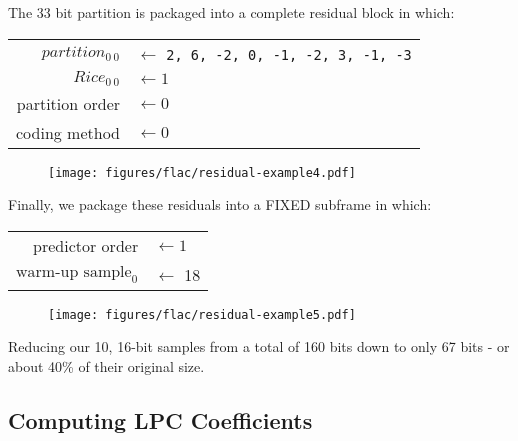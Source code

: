 The 33 bit partition is packaged into a complete residual block
in which:
\newline
\begin{tabular}{rl}
$partition_{0~0}$ & $\leftarrow$ \texttt{2, 6, -2, 0, -1, -2, 3, -1, -3} \\
$Rice_{0~0}$ & $\leftarrow 1$ \\
partition order & $\leftarrow 0$ \\
coding method & $\leftarrow 0$ \\
\end{tabular}
\begin{figure}[h]
\texttt{[image: figures/flac/residual-example4.pdf]}
\end{figure}
\par
Finally, we package these residuals into a FIXED subframe in which:
\newline
\begin{tabular}{rl}
predictor order & $\leftarrow 1$ \\
$\text{warm-up sample}_0$ & $\leftarrow $ 18 \\
\end{tabular}
\begin{figure}[h]
\texttt{[image: figures/flac/residual-example5.pdf]}
\end{figure}
\par
\noindent
Reducing our 10, 16-bit samples from a total of 160 bits
down to only 67 bits - or about 40\% of their original size.

\clearpage

\subsection{Computing LPC Coefficients}

